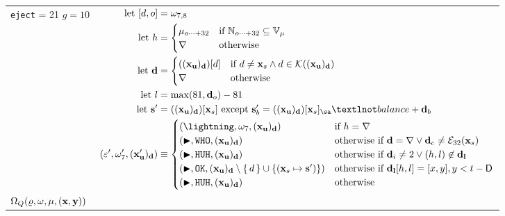 \begin{longtable}{p{3.5cm} p{12.5cm}}
{  \texttt{eject} = 21 \\
  $g = 10$} &
  $\begin{aligned}
    \using [d, o] &= \registers_{7, 8} \\
    \using h &= \begin{cases}
      \memory\subrange{o}{32} &\when \Nrange{o}{32} \subseteq \readable{\memory} \\
      \error &\otherwise
    \end{cases} \\
    \using \mathbf{d} &= \begin{cases}
      ((\mathbf{x}_\mathbf{u})_\mathbf{d})[d] &\when d \ne \mathbf{x}_s \wedge d \in \keys{(\mathbf{x}_\mathbf{u})_\mathbf{d}} \\
      \error &\otherwise \\
    \end{cases} \\
    \using l &= \max(81, \mathbf{d}_o) - 81 \\
    \using \mathbf{s}' &= ((\mathbf{x}_\mathbf{u})_\mathbf{d})[\mathbf{x}_s] \exc \mathbf{s}'_b = ((\mathbf{x}_\mathbf{u})_\mathbf{d})[\mathbf{x}_s]_\sa¬balance + \mathbf{d}_b \\
    (\execst', \registers'_7, (\mathbf{x}'_\mathbf{u})_\mathbf{d}) &\equiv \begin{cases}
      (\panic, \registers_7, (\mathbf{x}_\mathbf{u})_\mathbf{d}) &\when h = \error \\
      (\continue, \mathtt{WHO}, (\mathbf{x}_\mathbf{u})_\mathbf{d}) &\otherwhen \mathbf{d} = \error \vee \mathbf{d}_c \ne \se_{32}(\mathbf{x}_s) \\
      (\continue, \mathtt{HUH}, (\mathbf{x}_\mathbf{u})_\mathbf{d}) &\otherwhen \mathbf{d}_i \ne 2 \vee (h, l) \not\in \mathbf{d}_\mathbf{l} \\
      (\continue, \mathtt{OK}, (\mathbf{x}_\mathbf{u})_\mathbf{d} \setminus \set{d} \cup \set{ \kv{\mathbf{x}_s}{\mathbf{s}'} }) &\otherwhen \mathbf{d}_\mathbf{l}[h, l] = [x, y], y < t - \mathsf{D} \\
      (\continue, \mathtt{HUH}, (\mathbf{x}_\mathbf{u})_\mathbf{d}) &\otherwise \\
    \end{cases} \\
  \end{aligned}$\\
  \cmidrule(lr){1-1}\cmidrule(lr){2-2}
  \makecell*[l]{
  $\Omega_Q(\varrho, \omega, \mu, (\mathbf{x}, \mathbf{y}))$ \\
}
\end{longtable}
